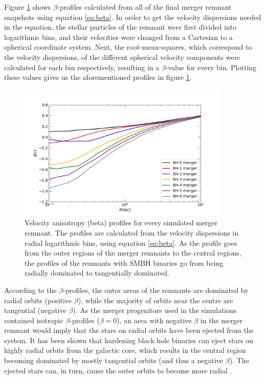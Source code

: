 \documentclass[english, oneside]{HYgradu}
\begin{document}
Figure \ref{figure:beta_no_rb} shows $\beta$-profiles calculated from all of the final merger remnant snapshots using equation \ref{eq:beta}. In order to get the velocity dispersions needed in the equation, the stellar particles of the remnant were first divided into logarithmic bins, and their velocities were changed from a Cartesian to a spherical coordinate system. Next, the root-mean-squares, which correspond to the velocity dispersions, of the different spherical velocity components were calculated for each bin respectively, resulting in a $\beta$-value for every bin. Plotting these values gives us the aforementioned profiles in figure \ref{figure:beta_no_rb}. 

\begin{figure}[h]
	\centering
	\includegraphics[width=0.9\textwidth]{beta_no_rb.png}
	\caption{Velocity anisotropy (beta) profiles for every simulated merger remnant. The profiles are calculated from the velocity dispersions in radial logarithmic bins, using equation \ref{eq:beta}. As the profile goes from the outer regions of the merger remnants to the central regions, the profiles of the remnants with SMBH binaries go from being radially dominated to tangentially dominated.}
	\label{figure:beta_no_rb}
\end{figure}

According to the $\beta$-profiles, the outer areas of the remnants are dominated by radial orbits (positive $\beta$), while the majority of orbits near the centre are tangential (negative $\beta$). As the merger progenitors used in the simulations contained isotropic $\beta$-profiles ($\beta = 0$), an area with negative $\beta$ in the merger remnant would imply that the stars on radial orbits have been ejected from the system. It has been shown that hardening black hole binaries can eject stars on highly radial orbits from the galactic core, which results in the central region becoming dominated by mostly tangential orbits (and thus a negative $\beta$). The ejected stars can, in turn, cause the outer orbits to become more radial \citep{Quinlan1997, Milosavljevic2001, Thomas2014}. 
\end{document}
